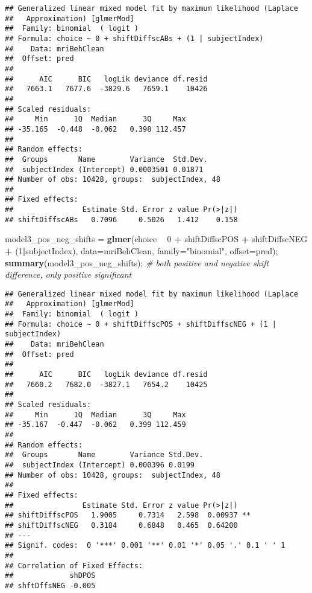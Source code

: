 \documentclass[]{article}
\newenvironment{Shaded}{\begin{snugshade}}{\end{snugshade}}
\newcommand{\CommentTok}[1]{\textcolor[rgb]{0.56,0.35,0.01}{\textit{#1}}}
\newcommand{\DataTypeTok}[1]{\textcolor[rgb]{0.13,0.29,0.53}{#1}}
\newcommand{\DecValTok}[1]{\textcolor[rgb]{0.00,0.00,0.81}{#1}}
\newcommand{\KeywordTok}[1]{\textcolor[rgb]{0.13,0.29,0.53}{\textbf{#1}}}
\newcommand{\NormalTok}[1]{#1}
\newcommand{\OperatorTok}[1]{\textcolor[rgb]{0.81,0.36,0.00}{\textbf{#1}}}
\newcommand{\StringTok}[1]{\textcolor[rgb]{0.31,0.60,0.02}{#1}}
\begin{document}
\begin{verbatim}
## Generalized linear mixed model fit by maximum likelihood (Laplace
##   Approximation) [glmerMod]
##  Family: binomial  ( logit )
## Formula: choice ~ 0 + shiftDiffscABs + (1 | subjectIndex)
##    Data: mriBehClean
##  Offset: pred
## 
##      AIC      BIC   logLik deviance df.resid 
##   7663.1   7677.6  -3829.6   7659.1    10426 
## 
## Scaled residuals: 
##     Min      1Q  Median      3Q     Max 
## -35.165  -0.448  -0.062   0.398 112.457 
## 
## Random effects:
##  Groups       Name        Variance  Std.Dev.
##  subjectIndex (Intercept) 0.0003501 0.01871 
## Number of obs: 10428, groups:  subjectIndex, 48
## 
## Fixed effects:
##                Estimate Std. Error z value Pr(>|z|)
## shiftDiffscABs   0.7096     0.5026   1.412    0.158
\end{verbatim}

\begin{Shaded}
\begin{Highlighting}[]
\NormalTok{model3_pos_neg_shifts =}\StringTok{ }\KeywordTok{glmer}\NormalTok{(choice }\OperatorTok{~}\StringTok{ }\DecValTok{0} \OperatorTok{+}\StringTok{ }\NormalTok{shiftDiffscPOS }\OperatorTok{+}\StringTok{ }\NormalTok{shiftDiffscNEG }\OperatorTok{+}\StringTok{ }\NormalTok{(}\DecValTok{1}\OperatorTok{|}\NormalTok{subjectIndex), }\DataTypeTok{data=}\NormalTok{mriBehClean, }\DataTypeTok{family=}\StringTok{"binomial"}\NormalTok{, }\DataTypeTok{offset=}\NormalTok{pred);}
\KeywordTok{summary}\NormalTok{(model3_pos_neg_shifts); }\CommentTok{# both positive and negative shift difference, only positive significant}
\end{Highlighting}
\end{Shaded}

\begin{verbatim}
## Generalized linear mixed model fit by maximum likelihood (Laplace
##   Approximation) [glmerMod]
##  Family: binomial  ( logit )
## Formula: choice ~ 0 + shiftDiffscPOS + shiftDiffscNEG + (1 | subjectIndex)
##    Data: mriBehClean
##  Offset: pred
## 
##      AIC      BIC   logLik deviance df.resid 
##   7660.2   7682.0  -3827.1   7654.2    10425 
## 
## Scaled residuals: 
##     Min      1Q  Median      3Q     Max 
## -35.167  -0.447  -0.062   0.399 112.459 
## 
## Random effects:
##  Groups       Name        Variance Std.Dev.
##  subjectIndex (Intercept) 0.000396 0.0199  
## Number of obs: 10428, groups:  subjectIndex, 48
## 
## Fixed effects:
##                Estimate Std. Error z value Pr(>|z|)   
## shiftDiffscPOS   1.9005     0.7314   2.598  0.00937 **
## shiftDiffscNEG   0.3184     0.6848   0.465  0.64200   
## ---
## Signif. codes:  0 '***' 0.001 '**' 0.01 '*' 0.05 '.' 0.1 ' ' 1
## 
## Correlation of Fixed Effects:
##             shDPOS
## shftDffsNEG -0.005
\end{verbatim}
\end{document}
